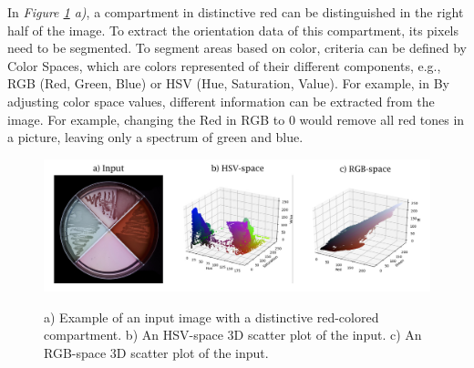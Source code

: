 \noindent In \textit{Figure \ref{fig:segmentation} a)}, a compartment in distinctive red can be distinguished in the right half of the image. To extract the orientation data of this compartment, its pixels need to be segmented. To segment areas based on color, criteria can be defined by Color Spaces, which are colors represented of their different components, e.g., RGB (Red, Green, Blue) or HSV (Hue, Saturation, Value). For example, in 
By adjusting color space values, different information can be extracted from the image. For example, changing the Red in RGB to 0 would remove all red tones in a picture, leaving only a spectrum of green and blue.\\

\begin{figure}[htbp]
    \centering
     \includegraphics[width=1.1\linewidth]{figures/PDF/Color_space.pdf}\\
    \caption{{a) Example of an input image with a distinctive red-colored compartment. b) An HSV-space 3D scatter plot of the input. c) An RGB-space 3D scatter plot of the input.}}
    \label{fig:segmentation}
\end{figure}



